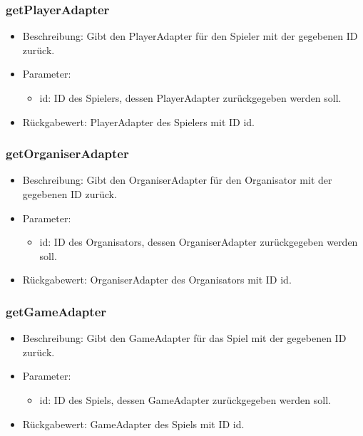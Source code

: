 \documentclass[a4paper]{scrreprt}
\begin{document}
	\subsubsection{getPlayerAdapter}
	\begin{itemize}
		\item Beschreibung: Gibt den PlayerAdapter für den Spieler mit der gegebenen ID zurück.
		\item Parameter:
		\begin{itemize}
			\item id: ID des Spielers, dessen PlayerAdapter zurückgegeben werden soll.
		\end{itemize}
		\item Rückgabewert: PlayerAdapter des Spielers mit ID id.
	\end{itemize}

	\subsubsection{getOrganiserAdapter}
	\begin{itemize}
		\item Beschreibung: Gibt den OrganiserAdapter für den Organisator mit der gegebenen ID zurück.
		\item Parameter:
		\begin{itemize}
			\item id: ID des Organisators, dessen OrganiserAdapter zurückgegeben werden soll.
		\end{itemize}
		\item Rückgabewert: OrganiserAdapter des Organisators mit ID id.
	\end{itemize}

	\subsubsection{getGameAdapter}
	\begin{itemize}
		\item Beschreibung: Gibt den GameAdapter für das Spiel mit der gegebenen ID zurück.
		\item Parameter:
		\begin{itemize}
			\item id: ID des Spiels, dessen GameAdapter zurückgegeben werden soll.
		\end{itemize}
		\item Rückgabewert: GameAdapter des Spiels mit ID id.
	\end{itemize}
\end{document}
